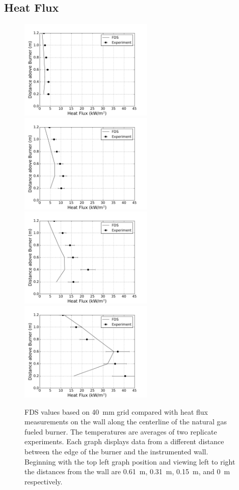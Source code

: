 \documentclass[twoside]{uocthesis}
\begin{document}
\subsection{Heat Flux}

\begin{figure}[ht!]
  \centering
  \includegraphics[width=2.5in]{../Figures/IWGB_NG_HF_Center_Avg_2D}
  \includegraphics[width=2.5in]{../Figures/IWGB_NG_HF_Center_Avg_1D}\\
  \includegraphics[width=2.5in]{../Figures/IWGB_NG_HF_Center_Avg_0p5D}
  \includegraphics[width=2.5in]{../Figures/IWGB_NG_HF_Center_Avg_0D}\\
  \caption[FDS values based on 40~mm grid compared with heat flux measurements on the wall along the centerline of the natural gas fueled burner]{FDS values based on 40~mm grid compared with heat flux measurements on the wall along the centerline of the natural gas fueled burner. The temperatures are averages of two replicate experiments. Each graph displays data from a different distance between the edge of the burner and the instrumented wall.  Beginning with the top left graph position and viewing left to right the distances from the wall are 0.61~m, 0.31~m, 0.15~m, and 0~m respectively.}
  \label{FDS_HFCL_TWNG_comp}
\end{figure}
\end{document}
